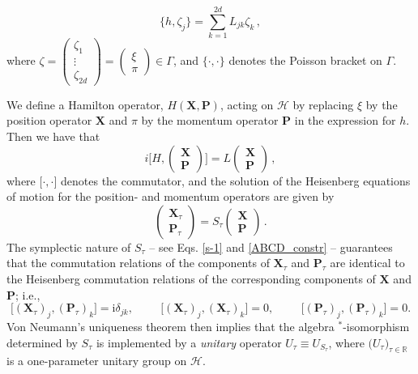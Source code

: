 \documentclass[12pt]{article}
\newcommand{\iu}{{\mathrm i}}
\begin{document}
\begin{equation}\label{Poisson}
\big\{ h, \zeta_j \big\} = \sum_{k=1}^{2d} L_{jk} \zeta_{k}\,,
\end{equation}
where $\zeta = \begin{pmatrix} \zeta_1 \\ \vdots \\ \zeta_{2d}\end{pmatrix}  = \begin{pmatrix} \xi \\ \pi \end{pmatrix} \in \Gamma$, and 
$\big\{\cdot, \cdot \big\}$ denotes the Poisson bracket on $\Gamma$.

We define a Hamilton operator, $H(\mathbf{X}, \mathbf{P})$, acting on $\mathcal{H}$ by replacing $\xi$ by the position operator $\mathbf{X}$ and $\pi$ by the momentum operator $\mathbf{P}$ in the expression for $h$. Then we have that
\begin{equation}\label{comm}
i \Big[ H, \begin{pmatrix} \mathbf{X} \\ \mathbf{P} \end{pmatrix} \Big] = 
L \begin{pmatrix} \mathbf{X} \\ \mathbf{P} \end{pmatrix}\,,
\end{equation}
where $\big[\cdot, \cdot \big]$ denotes the commutator, and the solution of the Heisenberg equations of motion for the position- and momentum operators are given by
\begin{equation}\label{Heisenberg-dyn}
\begin{pmatrix} \mathbf{X}_{\tau} \\ \mathbf{P}_{\tau} \end{pmatrix} = S_{\tau} \begin{pmatrix} \mathbf{X} \\ \mathbf{P} \end{pmatrix}\,. 
\end{equation}
The symplectic nature of $S_{\tau}$ -- see Eqs. \eqref{s-1} and \eqref{ABCD_constr} -- guarantees that the commutation relations of the components of $\mathbf{X}_{\tau}$ 
and $\mathbf{P}_{\tau}$ are identical to the Heisenberg commutation relations of the corresponding components of 
$\mathbf{X}$ and $\mathbf{P}$; i.e.,
$$
\big[(\mathbf X_ \tau)_j, (\mathbf P_ \tau)_k] = \iu \delta_{jk}, \hspace{1cm} \big[(\mathbf X_ \tau)_j, (\mathbf X_ \tau)_k] = 0, \hspace{1cm} \big[(\mathbf P_ \tau)_j, (\mathbf P_ \tau)_k] = 0  .
$$
Von Neumann's uniqueness theorem then implies that the algebra 
$^{*}$-isomorphism determined by $S_{\tau}$ is implemented by a \textit{unitary} operator $U_{\tau}\equiv U_{S_{\tau}}$, where 
$\big(U_{\tau}\big)_{\tau \in \mathbb{R}}$ is a one-parameter unitary group on $\mathcal{H}$.
\end{document}
